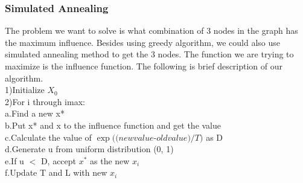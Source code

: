 \documentclass{article}
\begin{document}
\subsubsection{Simulated Annealing}   %
The problem we want to solve is what combination of 3 nodes in the graph has the maximum influence. Besides using greedy algorithm, we could also use simulated annealing method to get the 3 nodes.  The function we are trying to maximize is the influence function. The following is brief description of our algorithm. \\

\-\hspace{0.5cm}1)Initialize $X_{0}$ \\
\-\hspace{0.5cm}2)For i through imax: \\
\-\hspace{1cm}a.Find a new x* \\
\-\hspace{1cm}b.Put x*  and x to the influence function and get the value \\
\-\hspace{1cm}c.Calculate the value of $\exp((new value $-$ old value)/ T)$  as D \\
\-\hspace{1cm}d.Generate u from uniform distribution (0, 1) \\
\-\hspace{1cm}e.If u $<$ D,  accept $x^{*}$ as the new $x_{i}$ \\
\-\hspace{1cm}f.Update T and L with new $x_{i}$ \\
\end{document}
